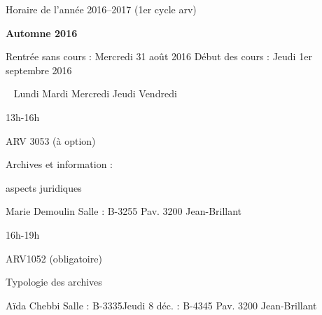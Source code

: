 \documentclass [12 pt]{article}
\begin{document}
        Horaire de l'année 2016–2017 (1er cycle arv)
        
            
        \textbf{
        Automne 2016
        }
    
            Rentrée sans cours : Mercredi 31 août 2016
            Début des cours : Jeudi 1er septembre 2016
            
                
                    
                        
                             
                            Lundi
                            Mardi
                            Mercredi
                            Jeudi
                            Vendredi
                        
                        
                            13h-16h
                             
                             
                             
                             
                            
                                
                                    ARV 3053 (à option)
                                
                                
                                    Archives et information : 
                                
                                
                                    aspects juridiques
                                
                                Marie Demoulin
                                Salle : B-3255
                                Pav. 3200 Jean-Brillant
                            
                        
                        
                            16h-19h
                            
                                
                                    ARV1052 (obligatoire)
                                
                                
                                    Typologie des archives
                                
                                Aïda Chebbi
                                Salle : B-3335Jeudi 8 déc. :
                                    B-4345
                                Pav. 3200 Jean-Brillant
                            
                            
                                
\end{document}
